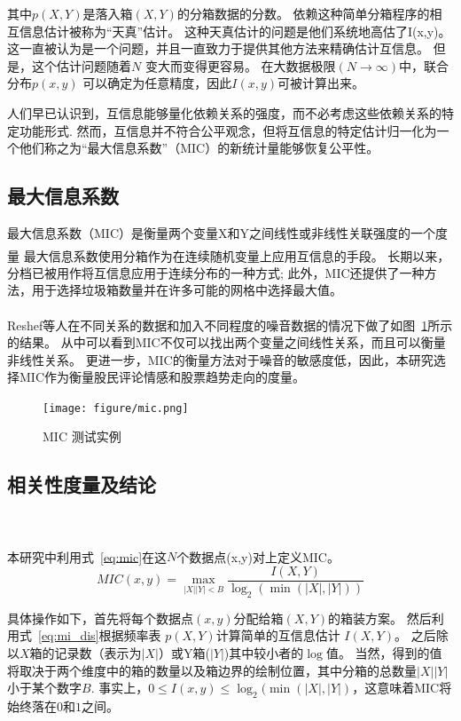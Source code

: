 \documentclass[cs4size,a4paper]{ctexart}
\numberwithin{equation}{section}
\numberwithin{table}{section}
\numberwithin{figure}{section}
\newcommand{\upcite}[1]{\textsuperscript{\textsuperscript{\cite{#1}}}}%
\begin{document}
其中$p(X,Y)$是落入箱$(X,Y)$的分箱数据的分数。 依赖这种简单分箱程序的相互信息估计被称为“天真”估计。 这种天真估计的问题是他们系统地高估了I(x,y)。 这一直被认为是一个问题，并且一直致力于提供其他方法来精确估计互信息。 但是，这个估计问题随着$N$ 变大而变得更容易。 在大数据极限$(N\to \infty)$中，联合分布$p(x,y)$ 可以确定为任意精度，因此$I(x,y)$可被计算出来。


人们早已认识到，互信息能够量化依赖关系的强度，而不必考虑这些依赖关系的特定功能形式. 然而，互信息并不符合公平观念，但将互信息的特定估计归一化为一个他们称之为“最大信息系数”（MIC）的新统计量能够恢复公平性。

\subsection{最大信息系数}

最大信息系数（MIC）是衡量两个变量X和Y之间线性或非线性关联强度的一个度量\upcite{reshef2011detecting}
最大信息系数使用分箱作为在连续随机变量上应用互信息的手段。 长期以来，分档已被用作将互信息应用于连续分布的一种方式; 此外，MIC还提供了一种方法，用于选择垃圾箱数量并在许多可能的网格中选择最大值。

Reshef等人\upcite{reshef2011detecting}在不同关系的数据和加入不同程度的噪音数据的情况下做了如图~\ref{fig:mic}所示的结果。
从中可以看到MIC不仅可以找出两个变量之间线性关系，而且可以衡量非线性关系。
更进一步，MIC的衡量方法对于噪音的敏感度低，因此，本研究选择MIC作为衡量股民评论情感和股票趋势走向的度量。
\begin{figure}
  \centering
  \texttt{[image: figure/mic.png]}
\caption{MIC 测试实例}
\label{fig:mic}
\end{figure}


\subsection{相关性度量及结论}~\label{subsec:sum}

本研究中利用式~\ref{eq:mic}在这$N$个数据点(x,y)对上定义MIC\upcite{reshef2011detecting}。
\begin{equation}\label{eq:mic}
  MIC(x,y) = \max_{ \left| X \right| \left| Y \right|<B}\frac{I(X,Y)}{\log_2 (\min( \left| X \right|, \left| Y \right|))}
\end{equation}

具体操作如下，首先将每个数据点$(x,y)$分配给箱$(X,Y)$的箱装方案。 然后利用式~\ref{eq:mi_dis}根据频率表  $p(X,Y)$计算简单的互信息估计 $I(X,Y)$。  之后除以$X$箱的记录数（表示为$|X|$）或Y箱($|Y|$)其中较小者的$\log$值。 当然，得到的值将取决于两个维度中的箱的数量以及箱边界的绘制位置，其中分箱的总数量$|X||Y|$小于某个数字$B$.
事实上，$0 \leq I(x,y) \leq \log_{2}(\min(|X|,|Y|)$，这意味着MIC将始终落在$0$和$1$之间。
\end{document}
